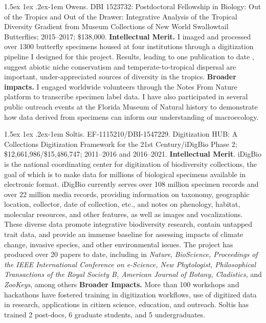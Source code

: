 \documentclass[11pt]{article}
\makeatletter
\renewcommand{\paragraph}{\@startsection{paragraph}{4}{\z@}
  {1.5ex \@plus 1ex \@minus .2ex}{-1em}
  {\normalfont\normalsize\it}
}
\makeatother
\begin{document}
\paragraph{Owens.} DBI 1523732: Postdoctoral Fellowship in Biology: Out of
the Tropics and Out of the Drawer: Integrative Analysis of the Tropical
Diversity Gradient from Museum Collections of New World Swallowtail
Butterflies; 2015--2017; \$138,000. \textbf{Intellectual Merit. }I
imaged and processed over 1300 butterfly specimens housed at four
institutions through a digitization pipeline I designed for this
project. Results, leading to one publication to date
\cite{Owens2017-ja}, suggest abiotic niche conservatism and
temperate-to-tropical dispersal are important, under-appreciated sources
of diversity in the tropics. \textbf{Broader impacts. }I engaged
worldwide volunteers through the Notes From Nature platform to
transcribe specimen label data. I have also participated in several
public outreach events at the Florida Museum of Natural history to
demonstrate how data derived from specimens can inform our understanding
of macroecology.

\paragraph{Soltis.} EF-1115210/DBI-1547229. Digitization HUB: A Collections
Digitization Framework for the 21st Century/iDigBio Phase 2;
\$12,661,986/\$15,486,747; 2011--2016 and 2016--2021.
\textbf{Intellectual Merit}. iDigBio is the national coordinating center
for digitization of biodiversity collections, the goal of which is to
make data for millions of biological specimens available in electronic
format. iDigBio currently serves over 108 million specimen records and
over 22 million media records, providing information on taxonomy,
geographic location, collector, date of collection, etc., and notes on
phenology, habitat, molecular resources, and other features, as well as
images and vocalizations. These diverse data promote integrative
biodiversity research, contain untapped trait data, and provide an
immense baseline for assessing impacts of climate change, invasive
species, and other environmental issues. The project has produced over
20 papers to date, including in \emph{Nature}, \emph{BioScience,
Proceedings of the IEEE International Conference on e-Science, New
Phytologist, Philosophical Transactions of the Royal Society B, American
Journal of Botany, Cladistics}, and \emph{ZooKeys}, among others
\textbf{Broader Impacts.} More than 100 workshops and hackathons have
fostered training in digitization workflows, use of digitized data in
research, applications in citizen science, education, and outreach.
Soltis has trained 2 post-docs, 6 graduate students, and 5
undergraduates.


\vbox{}
\end{document}
